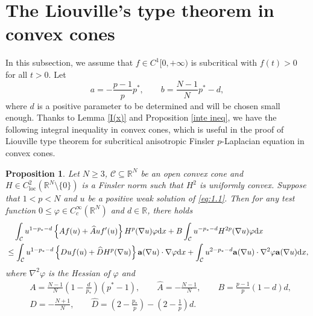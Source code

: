 \documentclass[12pt]{amsart}
\newtheorem{prop}[thm]{Proposition}
\theoremstyle{definition}
\theoremstyle{remark}
\theoremstyle{conclusion}
\theoremstyle{conjecture}
\numberwithin{equation}{section}
\begin{document}
\section{The Liouville's type theorem in convex cones}
In this subsection, we assume that $f\in C^{1}[0,+\infty)$ is subcritical with $f(t)>0$ for all $t>0$. Let
$$a=-\frac{p-1}{p}p^*,\qquad b=\frac{N-1}{N}p^*-d,$$
where $d$ is a positive parameter to be determined and will be chosen small enough. Thanks to Lemma \ref{I(x)} and Proposition \ref{inte ineq}, we have the following integral inequality in convex cones, which is useful in the proof of Liouville type theorem for subcritical anisotropic Finsler $p$-Laplacian equation in convex cones.
\begin{prop}\label{prop4.1}
Let $N\geq3$, $\mathcal{C}\subseteq\mathbb{R}^{N}$ be an open convex cone and $H\in C^{2}_{\text{loc}}(\mathbb{R}^{N}\setminus\{0\})$ is a Finsler norm such that $H^{2}$ is uniformly convex. Suppose that $1<p<N$ and $u$ be a positive weak solution of \eqref{eq:1.1}. Then for any test function $0\leq\varphi\in C^{\infty}_{c}(\mathbb{R}^N)$ and $d\in\mathbb{R}$, there holds
\begin{equation}\label{ineq4.1}
  \begin{aligned}
    &\quad \int_{\mathcal{C}}u^{1-p_*-d}\left\{Af(u)+\widehat{A}uf^{\prime}(u)\right\}H^p(\nabla u)\varphi\mathrm{d}x+B\int_{\mathcal{C}}u^{-p_*-d}H^{2p}(\nabla u)\varphi\mathrm{d}x\\
    &\leq \int_{\mathcal{C}}u^{1-p_*-d}\left\{Duf(u)+\widehat{D}H^{p}(\nabla u)\right\}{\bf{a}}(\nabla u)\cdot\nabla\varphi\mathrm{d}x+ \int_{\mathcal{C}}u^{2-p_*-d}{\bf{a}}(\nabla u)\cdot\nabla^2\varphi {\bf{a}}(\nabla u)\mathrm{d}x,
  \end{aligned}
\end{equation}
where $\nabla^2\varphi$ is the Hessian of $\varphi$ and
\begin{equation*}
  \begin{aligned}
    &A=\frac{N-1}{N}(1-\frac{d}{p_*})(p^*-1),\qquad\widehat{A}=-\frac{N-1}{N},\qquad B=\frac{p-1}{p}(1-d)d,\\
    &D=-\frac{N+1}{N},\qquad\widehat{D}=\left(2-\frac{p_*}{p}\right)-\left(2-\frac{1}{p}\right)d.
  \end{aligned}
\end{equation*}
\end{prop}
\end{document}
